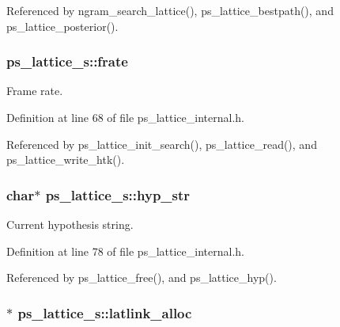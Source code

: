 \-Referenced by ngram\-\_\-search\-\_\-lattice(), ps\-\_\-lattice\-\_\-bestpath(), and ps\-\_\-lattice\-\_\-posterior().

\subsubsection[{frate}]{ {\bf ps\-\_\-lattice\-\_\-s\-::frate}}\label{structps__lattice__s_a5159a2ff1e03a7c9782854bc67e56530}


\-Frame rate. 



\-Definition at line 68 of file ps\-\_\-lattice\-\_\-internal.\-h.



\-Referenced by ps\-\_\-lattice\-\_\-init\-\_\-search(), ps\-\_\-lattice\-\_\-read(), and ps\-\_\-lattice\-\_\-write\-\_\-htk().

\subsubsection[{hyp\-\_\-str}]{\setlength{\rightskip}{0pt plus 5cm}char$\ast$ {\bf ps\-\_\-lattice\-\_\-s\-::hyp\-\_\-str}}\label{structps__lattice__s_ac3844c69f8393b607047bd9b302b979a}


\-Current hypothesis string. 



\-Definition at line 78 of file ps\-\_\-lattice\-\_\-internal.\-h.



\-Referenced by ps\-\_\-lattice\-\_\-free(), and ps\-\_\-lattice\-\_\-hyp().

\subsubsection[{latlink\-\_\-alloc}]{$\ast$ {\bf ps\-\_\-lattice\-\_\-s\-::latlink\-\_\-alloc}}\label{structps__lattice__s_afa8ca535dc8bf2cc656f6ad477e13b9f}


